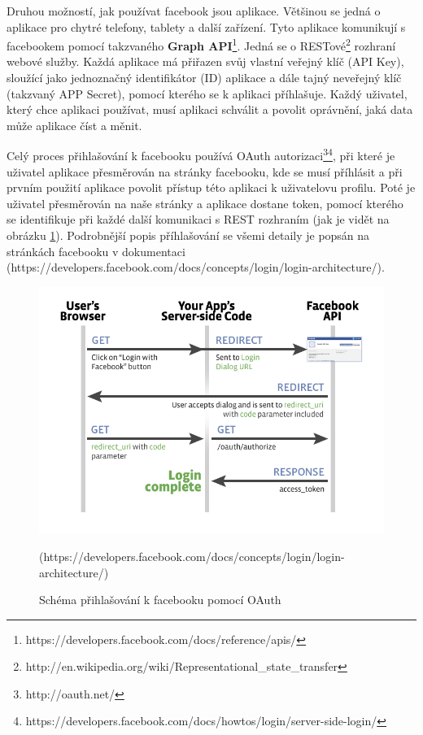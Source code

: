 \documentclass[thesis=M,czech]{FITthesis}[2013/05/10]
\begin{document}
Druhou možností, jak používat facebook jsou aplikace. Většinou se 
jedná o aplikace pro chytré telefony, tablety a další zařízení. Tyto 
aplikace komunikují s facebookem pomocí takzvaného 
\textbf{Graph API}\footnote{https://developers.facebook.com/docs/reference/apis/}. 
Jedná se o 
RESTové\footnote{http://en.wikipedia.org/wiki/Representational\_state\_transfer} 
rozhraní webové služby. 
Každá aplikace má přiřazen svůj vlastní veřejný klíč (API Key),
sloužící jako jednoznačný identifikátor (ID) aplikace a dále tajný
neveřejný klíč (takzvaný APP Secret), pomocí kterého se k aplikaci 
příhlašuje. Každý uživatel, který chce aplikaci používat, musí
aplikaci schválit a povolit oprávnění, jaká data může aplikace číst a měnit. 

Celý proces přihlašování k facebooku používá OAuth 
autorizaci\footnote{http://oauth.net/}\footnote{https://developers.facebook.com/docs/howtos/login/server-side-login/},
při které je uživatel aplikace přesměrován na stránky facebooku,
kde se musí příhlásit a při prvním použití aplikace povolit
přístup této aplikaci k uživatelovu profilu. 
Poté je uživatel přesměrován na naše stránky a aplikace dostane token,
pomocí kterého se identifikuje při každé další komunikaci s REST
rozhraním  (jak je vidět na obrázku \ref{fig:oAuthDiagram}). Podrobnější popis příhlašování se všemi detaily je popsán 
na stránkách facebooku v dokumentaci
\newline(https://developers.facebook.com/docs/concepts/login/login-architecture/). 

\begin{figure}[h]
\begin{center}
\includegraphics[width=5in]{figures/server-side-diagram.png}
\caption{Schéma přihlašování k facebooku pomocí OAuth}
(https://developers.facebook.com/docs/concepts/login/login-architecture/)
\label{fig:oAuthDiagram}
\end{center}
\end{figure}
\end{document}
